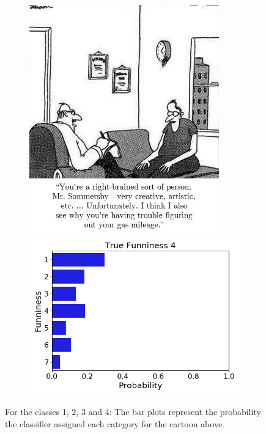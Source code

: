 \documentclass[draft,final,oneside]{vutinfth} %
\begin{document}
\begin{figure}
\begin{subfigure}[b]{0.45\textwidth}
\end{subfigure}\quad
\begin{subfigure}[b]{0.45\textwidth}
\centering
\includegraphics[width=0.9\textwidth,height=0.3\textheight,keepaspectratio]{graphics/detail/Test_for_Image_4_cartoon} \\
\includegraphics[width=1.0\textwidth]{graphics/detail/Test_for_Image_4}
\end{subfigure}

\caption{For the classes 1, 2, 3 and 4: The bar plots represent the probability the classifier assigned each category for the cartoon above.}

\label{fig:figdistr1}

\end{figure}
\end{document}
